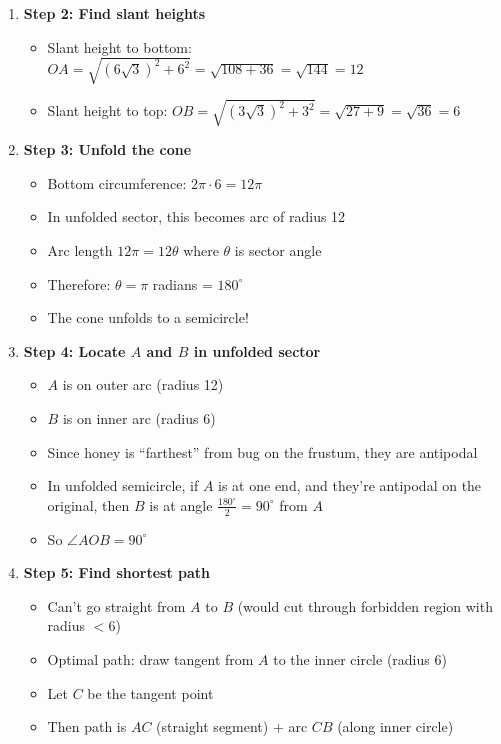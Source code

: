\documentclass[12pt]{article}
\begin{document}
\begin{techniquesbox}
\begin{itemize}[leftmargin=*]
\begin{enumerate}
        \item \textbf{Step 2: Find slant heights}
        \begin{itemize}
            \item Slant height to bottom: $OA = \sqrt{(6\sqrt{3})^2 + 6^2} = \sqrt{108 + 36} = \sqrt{144} = 12$
            \item Slant height to top: $OB = \sqrt{(3\sqrt{3})^2 + 3^2} = \sqrt{27 + 9} = \sqrt{36} = 6$
        \end{itemize}
        
        \item \textbf{Step 3: Unfold the cone}
        \begin{itemize}
            \item Bottom circumference: $2\pi \cdot 6 = 12\pi$
            \item In unfolded sector, this becomes arc of radius 12
            \item Arc length $12\pi = 12\theta$ where $\theta$ is sector angle
            \item Therefore: $\theta = \pi$ radians = $180^\circ$
            \item The cone unfolds to a semicircle!
        \end{itemize}
        
        \item \textbf{Step 4: Locate $A$ and $B$ in unfolded sector}
        \begin{itemize}
            \item $A$ is on outer arc (radius 12)
            \item $B$ is on inner arc (radius 6)
            \item Since honey is ``farthest'' from bug on the frustum, they are antipodal
            \item In unfolded semicircle, if $A$ is at one end, and they're antipodal on the original, then $B$ is at angle $\frac{180^\circ}{2} = 90^\circ$ from $A$
            \item So $\angle AOB = 90^\circ$
        \end{itemize}
        
        \item \textbf{Step 5: Find shortest path}
        \begin{itemize}
            \item Can't go straight from $A$ to $B$ (would cut through forbidden region with radius $< 6$)
            \item Optimal path: draw tangent from $A$ to the inner circle (radius 6)
            \item Let $C$ be the tangent point
            \item Then path is $AC$ (straight segment) + arc $CB$ (along inner circle)
        \end{itemize}
        

\end{enumerate}
\end{itemize}
\end{techniquesbox}
\end{document}
